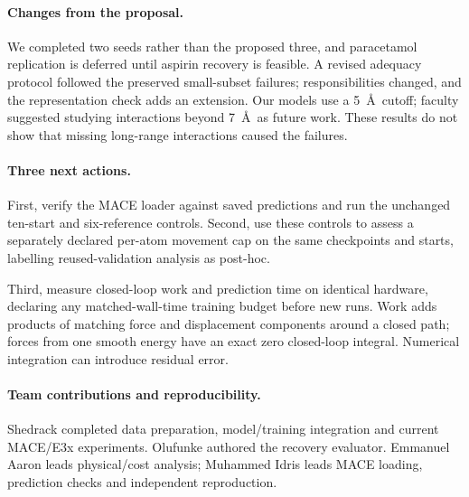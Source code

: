 \documentclass{article}
\begin{document}
\paragraph{Changes from the proposal.}
We completed two seeds rather than the proposed three, and paracetamol replication is deferred until aspirin recovery is feasible. A revised adequacy protocol followed the preserved small-subset failures; responsibilities changed, and the representation check adds an extension. Our models use a 5~\AA\ cutoff; faculty suggested studying interactions beyond 7~\AA\ as future work. These results do not show that missing long-range interactions caused the failures.
\paragraph{Three next actions.}
First, verify the MACE loader against saved predictions and run the unchanged ten-start and six-reference controls. Second, use these controls to assess a separately declared per-atom movement cap on the same checkpoints and starts, labelling reused-validation analysis as post-hoc.

Third, measure closed-loop work and prediction time on identical hardware, declaring any matched-wall-time training budget before new runs. Work adds products of matching force and displacement components around a closed path; forces from one smooth energy have an exact zero closed-loop integral. Numerical integration can introduce residual error.
\paragraph{Team contributions and reproducibility.}
Shedrack completed data preparation, model/training integration and current MACE/E3x experiments. Olufunke authored the recovery evaluator. Emmanuel Aaron leads physical/cost analysis; Muhammed Idris leads MACE loading, prediction checks and independent reproduction.
\end{document}
